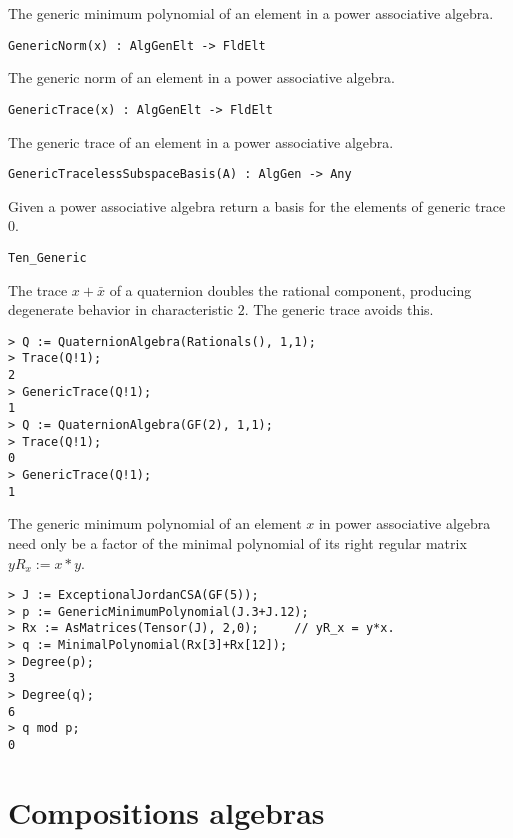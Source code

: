 The generic minimum polynomial of an element in a power associative algebra.

\color{blue}
{\small \begin{verbatim}
GenericNorm(x) : AlgGenElt -> FldElt
\end{verbatim}}
\color{black}
The generic norm of an element in a power associative algebra.

\color{blue}
{\small \begin{verbatim}
GenericTrace(x) : AlgGenElt -> FldElt
\end{verbatim}}
\color{black}

The generic trace of an element in a power associative algebra.

\color{blue}
{\small \begin{verbatim}
GenericTracelessSubspaceBasis(A) : AlgGen -> Any
\end{verbatim}}
\color{black}

Given a power associative algebra return a basis for the elements of generic trace 0.

\begin{framed}
 {\tt Ten\_Generic}\\
{\small
The trace $x+\bar{x}$ of a quaternion doubles the rational component, producing
degenerate behavior in characteristic $2$.  The generic trace avoids this.
\begin{lstlisting}[frame=single,basicstyle=\ttfamily\color{black!30!
teal},backgroundcolor=\color{white!70!gray}]
> Q := QuaternionAlgebra(Rationals(), 1,1);
> Trace(Q!1);        
2
> GenericTrace(Q!1);
1
> Q := QuaternionAlgebra(GF(2), 1,1);  
> Trace(Q!1);
0
> GenericTrace(Q!1);
1
\end{lstlisting}
The generic minimum polynomial of an element $x$ in power associative algebra
need only be a factor of the minimal polynomial of its right regular matrix $yR_x:=x*y$.
\begin{lstlisting}[frame=single,basicstyle=\ttfamily\color{black!30!
teal},backgroundcolor=\color{white!70!gray}]
> J := ExceptionalJordanCSA(GF(5));
> p := GenericMinimumPolynomial(J.3+J.12);
> Rx := AsMatrices(Tensor(J), 2,0);     // yR_x = y*x.
> q := MinimalPolynomial(Rx[3]+Rx[12]); 
> Degree(p);
3
> Degree(q);
6
> q mod p;
0
\end{lstlisting}
}
\end{framed}

\section{Compositions algebras}

